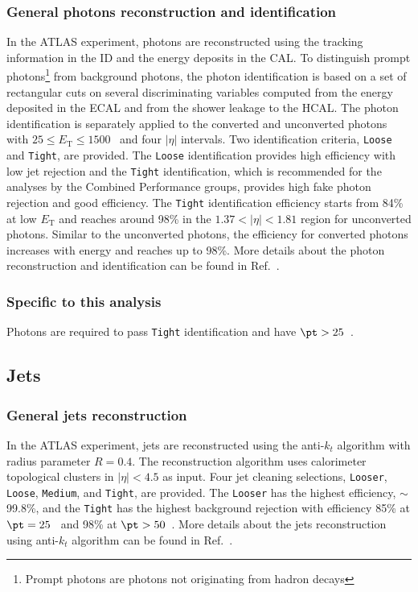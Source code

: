 \subsubsection{General photons reconstruction and identification}
\label{subsubsec:event_photons_general}
In the ATLAS experiment, photons are reconstructed using the tracking information in the ID and the energy deposits in the CAL.
To distinguish prompt photons\footnote{Prompt photons are photons not originating from hadron decays} from background photons, the photon identification is based on a set of rectangular cuts on several discriminating variables computed from the energy deposited in the ECAL and from the shower leakage to the HCAL.
The photon identification is separately applied to the converted and unconverted photons with $25 \le E_{\mathrm{T}} \le 1500$~{\GeV} and four $|\eta|$ intervals.
Two identification criteria, \texttt{Loose} and \texttt{Tight}, are provided.
The \texttt{Loose} identification provides high efficiency with low jet rejection and the \texttt{Tight} identification, which is recommended for the analyses by the Combined Performance groups, provides high fake photon rejection and good efficiency.
The \texttt{Tight} identification efficiency starts from 84\% at low $E_{\mathrm{T}}$ and reaches around 98\% in the $1.37 < |\eta| < 1.81$ region for unconverted photons.
Similar to the unconverted photons, the efficiency for converted photons increases with energy and reaches up to 98\%.
More details about the photon reconstruction and identification can be found in Ref.~\cite{ATLAS:2011kuc}.


\subsubsection{Specific to this analysis}
\label{subsubsec:event_photons_specific}
Photons are required to pass \texttt{Tight} identification and have $\pt > 25$~{\GeV}.


\subsection{Jets}
\label{subsec:event_jets}


\subsubsection{General jets reconstruction}
\label{subsubsec:event_jets_general}
In the ATLAS experiment, jets are reconstructed using the anti-$k_{t}$ algorithm with radius parameter $R = 0.4$.
The reconstruction algorithm uses calorimeter topological clusters in $|\eta| < 4.5$ as input.
Four jet cleaning selections, \texttt{Looser}, \texttt{Loose}, \texttt{Medium}, and \texttt{Tight}, are provided.
The \texttt{Looser} has the highest efficiency, $\sim$99.8\%, and the \texttt{Tight} has the highest background rejection with efficiency 85\% at $\pt = 25$~{\GeV} and 98\% at $\pt > 50$~{\GeV}.
More details about the jets reconstruction using anti-$k_{t}$ algorithm can be found in Ref.~\cite{Cacciari:2008gp}.

